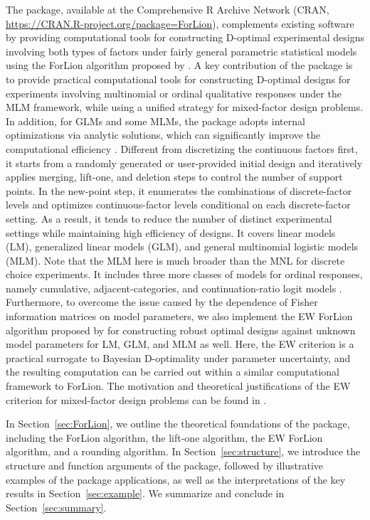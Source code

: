 The  package,  available at the Comprehensive R Archive Network (CRAN, \url{ https://CRAN.R-project.org/package=ForLion}), complements existing software by providing computational tools for constructing D-optimal experimental designs involving both types of factors under fairly general parametric statistical models using the ForLion algorithm proposed by \cite{huang2024forlion}. A key contribution of the package is to provide practical computational tools for constructing D-optimal designs for experiments involving multinomial or ordinal qualitative responses under the MLM framework, while using a unified strategy for mixed-factor design problems. In addition, for GLMs and some MLMs, the package adopts internal optimizations via analytic solutions, which can significantly improve the computational efficiency \citep{huang2024forlion}. Different from discretizing the continuous factors first, it starts from a randomly generated or user-provided initial design and iteratively applies merging, lift-one, and deletion steps to control the number of support points. In the new-point step, it enumerates the combinations of discrete-factor levels and optimizes continuous-factor levels conditional on each discrete-factor setting. As a result, it tends to reduce the number of distinct experimental settings while maintaining high efficiency of designs. It covers linear models (LM), generalized linear models (GLM), and general multinomial logistic models (MLM). Note that the MLM here is much broader than the MNL for discrete choice experiments. It includes three more classes of models for ordinal responses, namely cumulative, adjacent-categories, and continuation-ratio logit models \citep{bu2020}. Furthermore, to overcome the issue caused by the dependence of Fisher information matrices on model parameters, we also implement the EW ForLion algorithm proposed by \cite{lin2025ew} for constructing robust optimal designs against unknown model parameters for LM, GLM, and MLM as well. Here, the EW criterion is a practical surrogate to Bayesian D-optimality under parameter uncertainty, and the resulting computation can be carried out within a similar computational framework to ForLion. The motivation and theoretical justifications of the EW criterion for mixed-factor design problems can be found in \cite{lin2025ew}.

In Section~\ref{sec:ForLion}, we outline the theoretical foundations of the  package, including the ForLion algorithm, the lift-one algorithm, the EW ForLion algorithm, and a rounding algorithm. In Section~\ref{sec:structure}, we introduce the structure and function arguments of the  package, followed by illustrative examples of the package applications, as well as the interpretations of the key results in Section~\ref{sec:example}. We summarize and conclude in Section~\ref{sec:summary}. 

